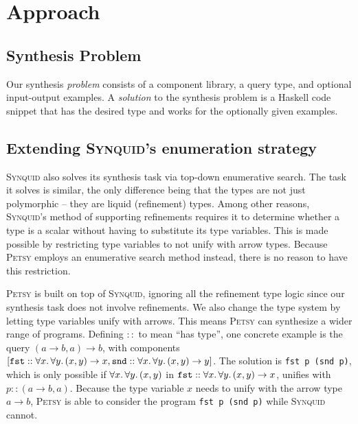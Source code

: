 \documentclass[acmsmall,nonacm]{acmart}
\begin{document}
\section{Approach}
\label{approach}



\subsection{Synthesis Problem}

Our synthesis \textit{problem} consists of a component library, a query type,
and optional input-output examples. A \textit{solution} to the synthesis 
problem is a Haskell code snippet that has the desired type and works 
for the optionally given examples.

\subsection{Extending \textsc{Synquid}'s enumeration strategy} 


\textsc{Synquid} also solves its synthesis task via top-down enumerative search.
The task it solves is similar, the only difference being that the types are
not just polymorphic -- they are liquid (refinement) types. Among other
reasons, \textsc{Synquid}'s method of supporting refinements requires it to
determine whether a type is a scalar without having to substitute its type
variables. This is made possible by restricting type variables to not unify
with arrow types. Because \textsc{Petsy} employs an enumerative search method
instead, there is no reason to have this restriction.

\textsc{Petsy} is built on top of \textsc{Synquid}, ignoring all the refinement
type logic since our synthesis task does not involve refinements. We also
change the type system by letting type variables unify with arrows.
This means \textsc{Petsy} can synthesize a wider range of programs.
Defining $::$ to mean ``has type'', one
concrete example is the query $(a \to b, a) \to b$, with components
$[\texttt{fst} :: \forall x\ldotp\forall y\ldotp (x,y)\to x, \texttt{snd} :: \forall x\ldotp\forall y\ldotp (x,y)\to y]$. The solution is \texttt{fst p
(snd p)}, which is only possible if $\forall x\ldotp\forall y\ldotp (x,y)$ in
$\texttt{fst} :: \forall x\ldotp\forall y\ldotp (x,y)\to x$,
unifies with $p :: (a \to b, a)$. Because the type variable $x$ needs to unify
with the arrow type $a \to b$, \textsc{Petsy} is able to consider the program
\texttt{fst p (snd p)} while \textsc{Synquid} cannot.
\end{document}
